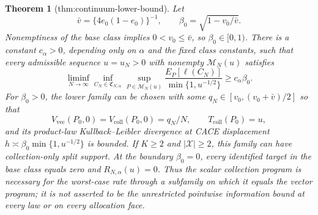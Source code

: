 \documentclass{article}
\newtheorem{theorem}{Theorem}
\begin{document}
\begin{theorem}[thm:continuum-lower-bound]\label{thm:continuum-lower-bound}
Let
\[
\bar v=\{4e_0(1-e_0)\}^{-1},
\qquad
\beta_0=\sqrt{1-v_0/\bar v}.
\]
Nonemptiness of the base class implies \(0<v_0\le\bar v\), so \(\beta_0\in[0,1)\). There is a constant \(c_\alpha>0\), depending only on \(\alpha\) and the fixed class constants, such that every admissible sequence \(u=u_N>0\) with nonempty \(\mathcal M_N(u)\) satisfies
\[
\liminf_{N\to\infty}
\inf_{C_N\in\mathfrak C_{N,\alpha}}
\sup_{P\in\mathcal M_N(u)}
\frac{E_P[\ell(C_N)]}{\min\{1,u^{-1/2}\}}
\ge c_\alpha\beta_0.
\]
For \(\beta_0>0\), the lower family can be chosen with some \(q_N\in[v_0,(v_0+\bar v)/2]\) so that
\[
V_{\mathrm{vec}}(P_0,0)=V_{\mathrm{coll}}(P_0,0)=q_N/N,
\qquad T_{\mathrm{coll}}(P_0)=u,
\]
and its product-law Kullback--Leibler divergence at CACE displacement \(h\asymp\beta_0\min\{1,u^{-1/2}\}\) is bounded. If \(K\ge2\) and \(|\mathcal X|\ge2\), this family can have collection-only split support. At the boundary \(\beta_0=0\), every identified target in the base class equals zero and \(R_{N,\alpha}(u)=0\). Thus the scalar collection program is necessary for the worst-case rate through a subfamily on which it equals the vector program; it is not asserted to be the unrestricted pointwise information bound at every law or on every allocation face.
\end{theorem}
\end{document}
